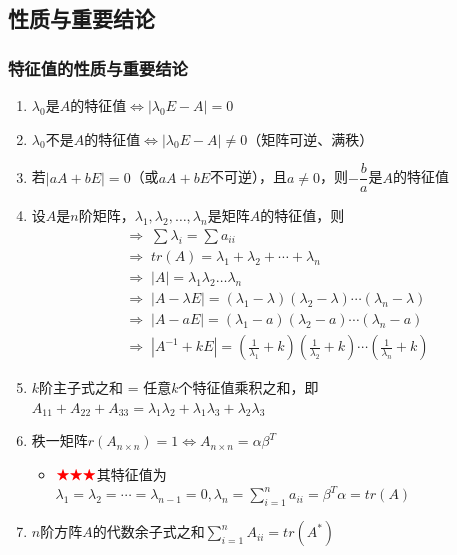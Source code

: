 \documentclass[./linear_algebra.tex]{subfiles}
\begin{document}
    \subsection{性质与重要结论}

    \subsubsection{特征值的性质与重要结论}

    \begin{enumerate}
        \item $\lambda_0$是$A$的特征值$\Leftrightarrow |\lambda_{0}E - A| = 0$
        \item $\lambda_0$不是$A$的特征值$\Leftrightarrow |\lambda_{0}E - A| \neq 0$（矩阵可逆、满秩）
        \item 若$|aA + bE| = 0$（或$aA + bE$不可逆），且$a \neq 0$，则$-\dfrac{b}{a}$是$A$的特征值
        \item 设$A$是$n$阶矩阵，$\lambda_1, \lambda_2, \dots, \lambda_n$是矩阵$A$的特征值，则
        \begin{align*}
            &\Rightarrow\; \sum \lambda_i = \sum a_{ii}  \\
            &\Rightarrow\; tr(A) = \lambda_1 + \lambda_2 + \cdots + \lambda_n \\
            &\Rightarrow\; |A| =\lambda_1\lambda_2\dots\lambda_n \\
            &\Rightarrow\; |A - \lambda E| = (\lambda_1 - \lambda)(\lambda_2 - \lambda)\cdots(\lambda_n - \lambda) \\
            &\Rightarrow\; |A - aE| = (\lambda_1 - a)(\lambda_2 - a)\cdots(\lambda_n - a) \\
            &\Rightarrow\; |A^{-1} + kE| = (\frac{1}{\lambda_1} + k)(\frac{1}{\lambda_2} + k)\cdots(\frac{1}{\lambda_n} + k)
        \end{align*}
        \item $k$阶主子式之和 = 任意$k$个特征值乘积之和，即$A_{11} + A_{22} + A_{33} = \lambda_1\lambda_2 + \lambda_1\lambda_3 + \lambda_2\lambda_3$
        \item 秩一矩阵$r(A_{n\times n}) = 1 \Leftrightarrow A_{n\times n} = \alpha\beta^T$
        \begin{itemize}
            \item $\color{red}{\bigstar\bigstar\bigstar}$其特征值为$\lambda_1 = \lambda_2 = \cdots = \lambda_{n-1} = 0, \lambda_n = \sum\limits_{i=1}^n a_{ii} = \beta^{T}\alpha = tr(A)$
        \end{itemize}
        \item $n$阶方阵$A$的代数余子式之和$\sum\limits_{i=1}^n A_{ii} = tr(A^*)$
    \end{enumerate}
\end{document}
